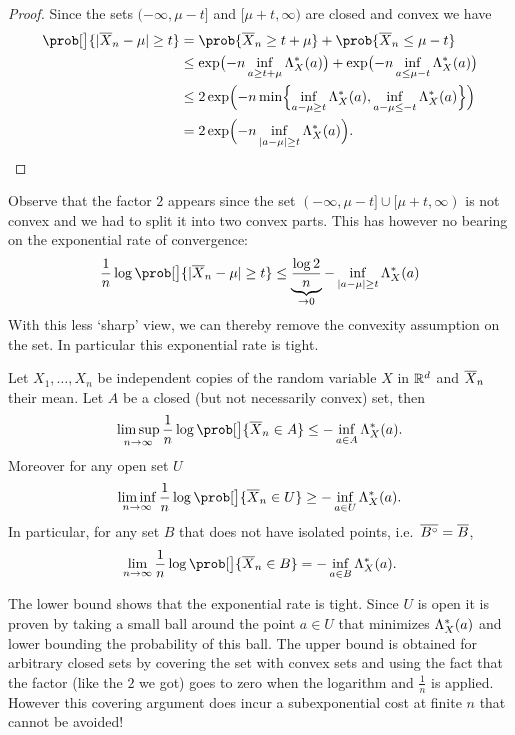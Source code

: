 \begin{proof}
    Since the sets \((-\infty, \mu - t]\) and \([\mu + t, \infty)\) are closed
    and convex we have
    \[\begin{aligned}[b]
        \prob[\big]{\abs{\mean{X}_n - \mu} \ge t}
        &= \prob{\mean{X}_n \ge t + \mu} + \prob{\mean{X}_n \le \mu - t}
        \\
        &\le \exp\bigl(-n \inf_{a \ge t+\mu}\CGF_X^*(a)\bigr) + \exp\bigl(-n \inf_{a \le \mu - t}\CGF_{X}^*(a)\bigr)
        \\
        &\le 2 \exp\Bigl(-n \min\set[\Big]{\inf_{a-\mu \ge t}\CGF_X^*(a), \inf_{a-\mu \le -t}\CGF_X^*(a)}\Bigr)
        \\
        &= 2 \exp\Bigl(-n \inf_{\abs{a-\mu}\ge t} \CGF_X^*(a)\Bigr).
    \end{aligned}
    \qedhere
    \]
\end{proof}

Observe that the factor \(2\) appears since the set \((-\infty, \mu - t]
\cup [\mu + t, \infty)\) is not convex and we had to split it into two convex
parts. This has however no bearing on the exponential rate of convergence:
\[
    \frac1n \log \prob[\big]{\abs{\mean{X}_n - \mu} \ge t}
    \le \underbrace{\frac{\log{2}}n}_{\to 0} - \inf_{\abs{a-\mu}\ge t} \CGF_X^*(a)
\]
With this less `sharp' view, we can thereby remove the convexity assumption on the set.
In particular this exponential rate is tight.

\begin{mdframed}[innertopmargin=0pt]
\begin{fact}
    Let \(X_1, \ldots, X_n\) be independent copies of the random variable \(X\) 
    in \(\mathbb{R}^d\) and \(\overline{X}_n\) their mean. Let \(A\) be a closed (but
    not necessarily convex) set, then
    \[
        \limsup_{n\to\infty} \frac1n \log \prob[\big]{\mean{X}_n \in A} \le -\inf_{a\in A} \CGF_X^*(a).
    \]
    Moreover for any open set \(U\)
    \[
        \liminf_{n\to\infty} \frac1n \log \prob[\big]{\mean{X}_n \in U} \ge -\inf_{a\in U} \CGF_X^*(a).
    \]
    In particular, for any set \(B\) that does not have isolated points, i.e.~\(\overline{B^{\circ}} = \overline{B}\),
    \[
        \lim_{n\to\infty} \frac1n \log \prob[\big]{\mean{X}_n \in B} = -\inf_{a\in B} \CGF_X^*(a).
    \]
\end{fact}
\end{mdframed}

The lower bound shows that the exponential rate is tight. Since \(U\)
is open it is proven by taking a small ball around the point \(a\in U\) that minimizes \(\Lambda_X^*(a)\) and
lower bounding the probability of this ball.
The upper bound is obtained for
arbitrary closed sets by covering the set with convex sets and using the fact
that the factor (like the \(2\) we got) goes to zero when the logarithm and
\(\frac1n\) is applied.
However this covering argument does incur a subexponential cost at finite \(n\) that cannot be
avoided! 

